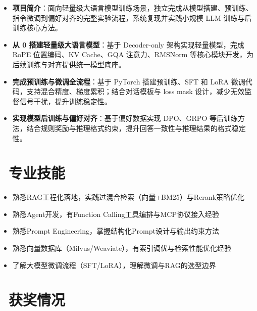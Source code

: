 \documentclass{resume}
\begin{document}
\begin{itemize}
  \item \textbf{项目简介}：面向轻量级大语言模型训练场景，独立完成从模型搭建、预训练、指令微调到偏好对齐的完整实验流程，系统复现并实践小规模 LLM 训练与后训练核心方法。
  \item \textbf{从 0 搭建轻量级大语言模型}：基于 Decoder-only 架构实现轻量模型，完成 RoPE 位置编码、KV Cache、GQA 注意力、RMSNorm 等核心模块开发，为后续训练与对齐提供统一模型底座。
  \item \textbf{完成预训练与微调全流程}：基于 PyTorch 搭建预训练、SFT 和 LoRA 微调代码，支持混合精度、梯度累积；结合对话模板与 loss mask 设计，减少无效监督信号干扰，提升训练稳定性。
  \item \textbf{实现模型后训练与偏好对齐}：基于偏好数据实现 DPO、GRPO 等后训练方法，结合规则奖励与推理格式约束，提升回答一致性与推理结果的格式稳定性。
\end{itemize}


\section{\texorpdfstring{\faCogs\ 专业技能}{专业技能}}
\begin{itemize}[parsep=0.3ex, leftmargin=*]
  \item 熟悉RAG工程化落地，实践过混合检索（向量+BM25）与Rerank策略优化
  \item 熟悉Agent开发，有Function Calling工具编排与MCP协议接入经验
  \item 熟悉Prompt Engineering，掌握结构化Prompt设计与输出约束方法
  \item 熟悉向量数据库（Milvus/Weaviate），有索引调优与检索性能优化经验
  \item 了解大模型微调流程（SFT/LoRA），理解微调与RAG的选型边界
\end{itemize}

\section{\texorpdfstring{\faHeartO\ 获奖情况}{获奖情况}}
\end{document}
